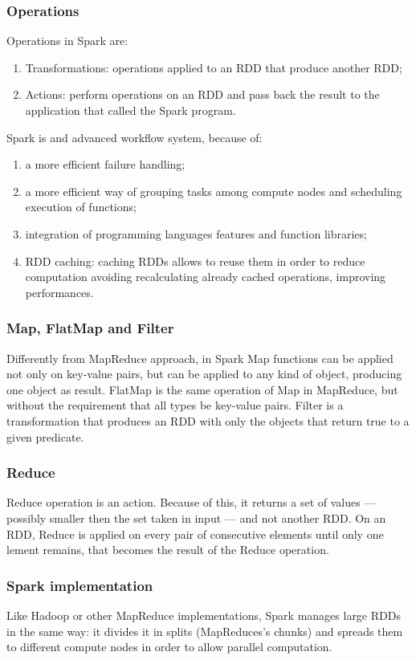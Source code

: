 \documentclass[\main/main.tex]{subfiles}
\begin{document}
\subsubsection{Operations}
Operations in Spark are:
\begin{enumerate}
    \item Transformations: operations applied to an RDD that produce another RDD;
    \item Actions: perform operations on an RDD and pass back the result to the application that called the Spark program.
\end{enumerate}
Spark is and advanced workflow system, because of:
\begin{enumerate}
    \item a more efficient failure handling;
    \item a more efficient way of grouping tasks among compute nodes and scheduling execution of functions;
    \item integration of programming languages features and function libraries;
    \item RDD caching: caching RDDs allows to reuse them in order to reduce computation avoiding recalculating already cached operations, improving performances. 
\end{enumerate}
\subsubsection{Map, FlatMap and Filter}
Differently from MapReduce approach, in Spark Map functions can be applied not only on key-value pairs, but can be applied to any kind of object, producing one object as result. 
FlatMap is the same operation of Map in MapReduce, but without the requirement that all types be key-value pairs. Filter is a transformation that produces an RDD with only the objects that return true to a given predicate.
\subsubsection{Reduce}
Reduce operation is an action. Because of this, it returns a set of values --- possibly smaller then the set taken in input --- and not another RDD. On an RDD, Reduce is applied on every pair of consecutive elements until only one lement remains, that becomes the result of the Reduce operation.
\subsubsection{Spark implementation}
Like Hadoop or other MapReduce implementations, Spark manages large RDDs in the same way: it divides it in splits (MapReduces's chunks) and spreads them to different compute nodes in order to allow parallel computation.
\end{document}
